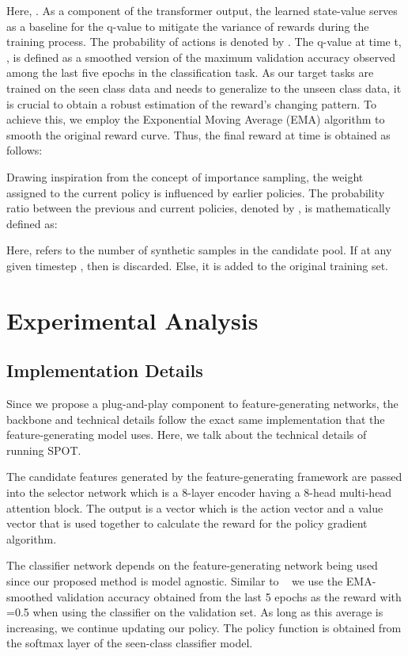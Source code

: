 \documentclass[10pt,twocolumn,letterpaper]{article}
\begin{document}
Here, . As a component of the transformer output, the learned state-value   serves as a baseline for the q-value to mitigate the variance of rewards during the training process. The probability of actions is denoted by . The q-value at time t, , is defined as a smoothed version of the maximum validation accuracy observed among the last five epochs in the classification task. As our target tasks are trained on the seen class data and needs to generalize to the unseen class data, it is crucial to obtain a robust estimation of the reward's changing pattern. To achieve this, we employ the Exponential Moving Average (EMA) algorithm to smooth the original reward curve. Thus, the final reward at time  is obtained as follows:



Drawing inspiration from the concept of importance sampling, the weight assigned to the current policy is influenced by earlier policies. The probability ratio between the previous and current policies, denoted by , is mathematically defined as:


Here,  refers to the number of synthetic samples in the candidate pool. If at any given timestep ,  then  is discarded. Else, it is added to the original training set.

\section{Experimental Analysis}
\label{sec:exp}



\subsection{Implementation Details}

Since we propose a plug-and-play component to feature-generating networks, the backbone and technical details follow the exact same implementation that the feature-generating model uses. Here, we talk about the technical details of running SPOT.

The candidate features generated by the feature-generating framework are passed into the selector network which is a 8-layer encoder having a 8-head multi-head attention block. The output is a vector  which is the action vector and a value vector  that is used together to calculate the reward for the policy gradient algorithm.

The classifier network depends on the feature-generating network being used since our proposed method is model agnostic. Similar to ~\cite{L2A,ye2020synthetic} we use the EMA-smoothed validation accuracy obtained from the last 5 epochs as the reward with =0.5 when using the classifier on the validation set. As long as this average is increasing, we continue updating our policy. The policy function  is obtained from the softmax layer of the seen-class classifier model.
\end{document}
